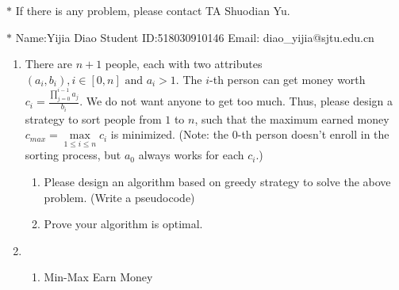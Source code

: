 \documentclass[12pt,a4paper]{article}
\makeatletter
\newtheorem*{solution}{Solution}
\theoremstyle{definition}
\renewenvironment{solution}[1][Solution] {\par\pushQED{\qed}\normalfont\topsep6\p@\@plus6\p@\relax\trivlist\item[\hskip\labelsep\bfseries#1\@addpunct{.}]\ignorespaces}{\popQED\endtrivlist\@endpefalse} \makeatother
\makeatother
\begin{document}
\noindent

\noindent{}
\begin{center}
\footnotesize{\color{red}$*$ If there is any problem, please contact TA Shuodian Yu.}

\footnotesize{\color{blue}$*$ Name:Yijia Diao  \quad Student ID:518030910146 \quad Email: diao\_yijia@sjtu.edu.cn}
\end{center}

\begin{enumerate}
    \item
    There are $n+1$ people, each with two attributes $(a_i,b_i), i\in[0,n] \text{ and } a_i>1$. The $i$-th person can get money worth $c_i = \frac{\prod_{j=0}^{i-1}{a_j}}{b_i}$. We do not want anyone to get too much. Thus, please design a strategy to sort people from $1$ to $n$, such that the maximum earned money $c_{max}=\max\limits_{1\leq i\leq n} c_i$ is minimized. (Note: the 0-th person doesn't enroll in the sorting process, but $a_0$ always works for each $c_i$.)
    \begin{enumerate}
        \item Please design an algorithm based on greedy strategy to solve the above problem. (Write a pseudocode)
        \item Prove your algorithm is optimal.
    \end{enumerate}

    \begin{solution}\hspace*{\fill}
        \begin{enumerate}
        	\item
        	\begin{minipage}[t]{0.85\textwidth}
        		\begin{algorithm}[H]
        			\BlankLine
        			\caption{Min-Max Earn Money}
        			\label{Alg-MinmaxEarn}
        			

\end{algorithm}
\end{minipage}
\end{enumerate}
\end{solution}
\end{enumerate}
\end{document}
